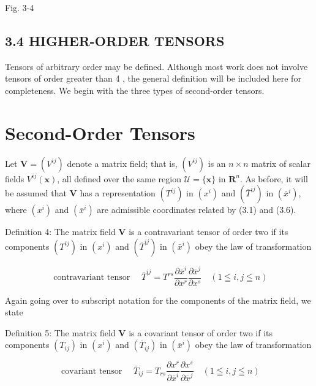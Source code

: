 \documentclass[10pt]{article}
\begin{document}
Fig. 3-4

\subsection*{3.4 HIGHER-ORDER TENSORS}
Tensors of arbitrary order may be defined. Although most work does not involve tensors of order greater than 4 , the general definition will be included here for completeness. We begin with the three types of second-order tensors.

\section*{Second-Order Tensors}
Let $\mathbf{V}=\left(V^{i j}\right)$ denote a matrix field; that is, $\left(V^{i j}\right)$ is an $n \times n$ matrix of scalar fields $V^{i j}(\mathbf{x})$, all defined over the same region $\mathscr{U}=\{\mathbf{x}\}$ in $\mathbf{R}^{n}$. As before, it will be assumed that $\mathbf{V}$ has a representation $\left(T^{i j}\right)$ in $\left(x^{i}\right)$ and $\left(\bar{T}^{i j}\right)$ in $\left(\bar{x}^{i}\right)$, where $\left(x^{i}\right)$ and $\left(\bar{x}^{i}\right)$ are admissible coordinates related by (3.1) and (3.6).

Definition 4: The matrix field $\mathbf{V}$ is a contravariant tensor of order two if its components $\left(T^{i j}\right)$ in $\left(x^{i}\right)$ and $\left(\bar{T}^{i j}\right)$ in $\left(\bar{x}^{i}\right)$ obey the law of transformation


\begin{equation*}
\text { contravariant tensor } \quad \bar{T}^{i j}=T^{r s} \frac{\partial \bar{x}^{i}}{\partial x^{r}} \frac{\partial \bar{x}^{j}}{\partial x^{s}} \quad(1 \leqq i, j \leqq n) \tag{3.11}
\end{equation*}


Again going over to subscript notation for the components of the matrix field, we state

Definition 5: The matrix field $\mathbf{V}$ is a covariant tensor of order two if its components $\left(T_{i j}\right)$ in $\left(x^{i}\right)$ and $\left(\bar{T}_{i j}\right)$ in $\left(\bar{x}^{i}\right)$ obey the law of transformation


\begin{equation*}
\text { covariant tensor } \quad \bar{T}_{i j}=T_{r s} \frac{\partial x^{r}}{\partial \bar{x}^{i}} \frac{\partial x^{s}}{\partial \bar{x}^{j}} \quad(1 \leqq i, j \leqq n) \tag{3.12}
\end{equation*}
\end{document}
